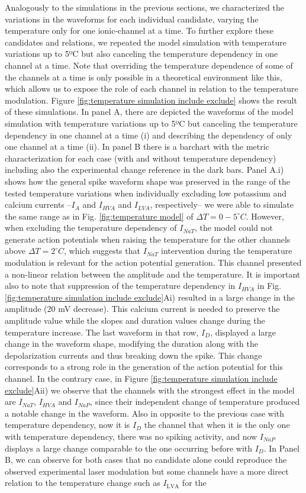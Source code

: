 Analogously to the simulations in the previous sections, we characterized the variations in the waveforms for each individual candidate, varying the temperature only for one ionic-channel at a time. To further explore these candidates and relations, we repeated the model simulation with temperature variations up to 5ºC but also canceling the temperature dependency in one channel at a time. Note that overriding the temperature dependence of some of the channels at a time is only possible in a theoretical environment like this, which allows us to expose the role of each channel in relation to the temperature modulation. Figure \ref{fig:temperature simulation include exclude} shows the result of these simulations. In panel A, there are depicted the waveforms of the model simulation with temperature variations up to 5ºC but canceling the temperature dependency in one channel at a time (i) and describing the dependency of only one channel at a time (ii). In panel B there is a barchart with the metric characterization for each case (with and without temperature dependency) including also the experimental change reference in the dark bars. Panel A.i) shows how the general spike waveform shape was preserved in the range of the tested temperature variations when individually excluding low potassium and calcium currents --$I_{A}$ and $I_{HVA}$ and $I_{LVA}$, respectively-- we were able to simulate the same range as in Fig. \ref{fig:temperature model} of $\Delta T=0-5 ^{\circ}C$. However, when excluding the temperature dependency of $I_{NaT}$, the model could not generate action potentials when raising the temperature for the other channels above $\Delta T=2 ^{\circ}C$, which suggests that $I_{NaT}$ intervention during the temperature modulation is relevant for the action potential generation. This channel presented a non-linear relation between the amplitude and the temperature. It is important also to note that suppression of the temperature dependency in $I_{HVA}$ in Fig. \ref{fig:temperature simulation include exclude}Ai) resulted in a large change in the amplitude (20 mV decrease). This calcium current is needed to preserve the amplitude value while the slopes and duration values change during the temperature increase. The last waveform in that row, $I_D$, displayed a large change in the waveform shape, modifying the duration along with the depolarization currents and thus breaking down the spike. This change corresponds to a strong role in the generation of the action potential for this channel. In the contrary case, in Figure \ref{fig:temperature simulation include exclude}Aii) we observe that the channels with the strongest effect in the model are $I_{NaT}$, $I_{HVA}$ and $I_{NaP}$, since their independent change of temperature produced a notable change in the waveform. Also in opposite to the previous case with temperature dependency, now it is $I_{D}$ the channel that when it is the only one with temperature dependency, there was no spiking activity, and now $I_{NaP}$ displays a large change comparable to the one occurring before with $I_{D}$. In Panel B, we can observe for both cases that no candidate alone could reproduce the observed experimental laser modulation but some channels have a more direct relation to the temperature change such as  $I_{\textrm{LVA}}$ for the 